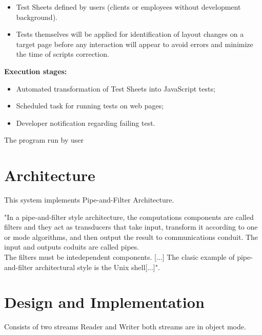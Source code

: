 \begin{itemize}
\item Test Sheets defined by users (clients or employees without development background).
\item Tests themselves will be applied for identification of layout changes on a target page before any interaction will appear to avoid errors and minimize the time of scripts correction.
\end{itemize}
 
\textbf{Execution stages:}
\begin{itemize}
\item Automated transformation of Test Sheets into JavaScript tests;
\item Scheduled task for running tests on web pages;
\item Developer notification regarding failing test.
\end{itemize}

The program run by user 


\section{Architecture} 
This system implements Pipe-and-Filter Architecture. \cite{Dooley} \cite{nodejsbook}

"In a pipe-and-filter style architecture, the computations components are called filters and they act as transducers that take input, transform it according to one or mode algorithms, and then output the result to communications conduit. The input and outputs coduits are called pipes.\\
The filters must be intedependent components. [...] The clasic example of pipe-and-filter architectural style is the Unix shell[...]"\cite{Dooley}.


\section{Design and Implementation}
Consists of two streams Reader and Writer both streams are in object mode.

